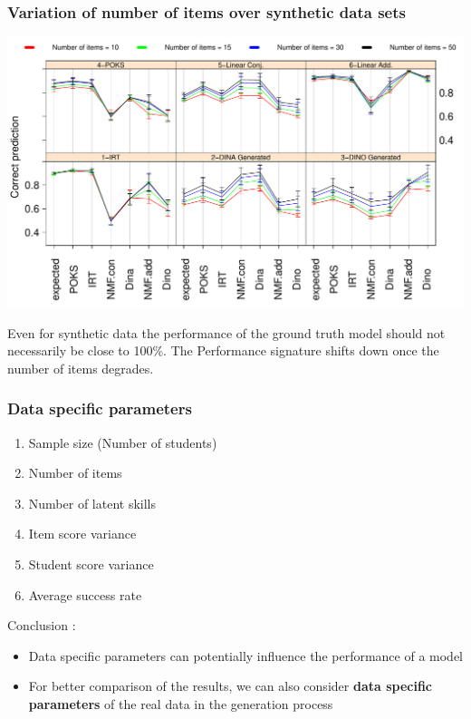\documentclass{beamer}
\begin{document}
\begin{frame}\frametitle{Variation of number of items over synthetic data sets}
\includegraphics[scale =0.37] {images/numberofitems}
\begin{overprint}
	   Even for synthetic data the performance of the ground truth model should not necessarily be close to 100\%.
       The Performance signature shifts down once the number of items degrades.
\end{overprint}
\end{frame}

\begin{frame}\frametitle{Data specific parameters}
\begin{enumerate}
\item Sample size (Number of students)
\item Number of items
\item Number of latent skills
\item Item score variance 
\item Student score variance
\item Average success rate\pause
\end{enumerate}
Conclusion :
\begin{itemize}
      \item Data specific parameters can potentially influence the performance of a model%
	  \item For better comparison of the results, we can also consider \textbf{data specific parameters} of the real data in the generation process%
\end{itemize}
\end{frame}
\end{document}
